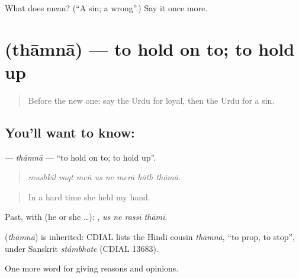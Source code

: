 \begin{tcolorbox}[breakable,colback=teal!4,colframe=teal!35!black,title={Before you move on}]
What does  mean? (\textquotedblleft{}A sin; a wrong\textquotedblright{}.) Say it once more.
\end{tcolorbox}
\section[\texorpdfstring{\ur{تھامنا} (thāmnā)}{تھامنا (thāmnā)}]{ (thāmnā) — to hold on to; to hold up}

\label{lesson:UR-C360-thamna}



\begin{quote}
Before the new one: say the Urdu for loyal, then the Urdu for a sin.
\end{quote}

\subsection*{You'll want to know: }
\textbf{} — \emph{thāmnā} — \textquotedblleft{}to hold on to; to hold up\textquotedblright{}.

\begin{quote}
       
\end{quote}

\begin{quote}
\emph{mushkil vaqt meṅ us ne merā hāth thāmā.}
\end{quote}

\begin{quote}
In a hard time she held my hand.
\end{quote}

Past, with  (he or she …):    , \emph{us ne rassī thāmī}.

\begin{cousinweb}
\textbf{} (\emph{thāmnā}) is inherited: CDIAL lists the Hindi cousin \emph{thāmnā}, \textquotedblleft{}to prop, to stop\textquotedblright{}, under Sanskrit \emph{stámbhate} (CDIAL 13683).
\end{cousinweb}

\begin{grammarlens}[title={What you've built}]
One more word for giving reasons and opinions.
\end{grammarlens}


